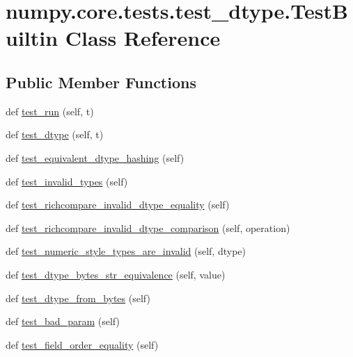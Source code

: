 \hypertarget{classnumpy_1_1core_1_1tests_1_1test__dtype_1_1TestBuiltin}{}\section{numpy.\+core.\+tests.\+test\+\_\+dtype.\+Test\+Builtin Class Reference}
\label{classnumpy_1_1core_1_1tests_1_1test__dtype_1_1TestBuiltin}
\subsection*{Public Member Functions}
\begin{DoxyCompactItemize}
\item 
def \hyperlink{classnumpy_1_1core_1_1tests_1_1test__dtype_1_1TestBuiltin_a9cf3c6b52b84e3db575e051558890263}{test\+\_\+run} (self, t)
\item 
def \hyperlink{classnumpy_1_1core_1_1tests_1_1test__dtype_1_1TestBuiltin_a336a8537bdbfcbe65d63fcca389a67c2}{test\+\_\+dtype} (self, t)
\item 
def \hyperlink{classnumpy_1_1core_1_1tests_1_1test__dtype_1_1TestBuiltin_a608e2c7ca1c4a6c6e9f61ad63c1aa0ec}{test\+\_\+equivalent\+\_\+dtype\+\_\+hashing} (self)
\item 
def \hyperlink{classnumpy_1_1core_1_1tests_1_1test__dtype_1_1TestBuiltin_a349337e58f527c99e71562c83eb94450}{test\+\_\+invalid\+\_\+types} (self)
\item 
def \hyperlink{classnumpy_1_1core_1_1tests_1_1test__dtype_1_1TestBuiltin_a805e97f2e760c631ed47b16bfa85af03}{test\+\_\+richcompare\+\_\+invalid\+\_\+dtype\+\_\+equality} (self)
\item 
def \hyperlink{classnumpy_1_1core_1_1tests_1_1test__dtype_1_1TestBuiltin_ae5f1c95dad9bc80fb75cafd2eeae1237}{test\+\_\+richcompare\+\_\+invalid\+\_\+dtype\+\_\+comparison} (self, operation)
\item 
def \hyperlink{classnumpy_1_1core_1_1tests_1_1test__dtype_1_1TestBuiltin_a54f89532774948e1b50fce0955196248}{test\+\_\+numeric\+\_\+style\+\_\+types\+\_\+are\+\_\+invalid} (self, dtype)
\item 
def \hyperlink{classnumpy_1_1core_1_1tests_1_1test__dtype_1_1TestBuiltin_ab5bb6cbd47b48b36bc7fbb011b94935e}{test\+\_\+dtype\+\_\+bytes\+\_\+str\+\_\+equivalence} (self, value)
\item 
def \hyperlink{classnumpy_1_1core_1_1tests_1_1test__dtype_1_1TestBuiltin_abc18da2587cf9e2c89921d2d4bc7f32b}{test\+\_\+dtype\+\_\+from\+\_\+bytes} (self)
\item 
def \hyperlink{classnumpy_1_1core_1_1tests_1_1test__dtype_1_1TestBuiltin_a88a1e17a6d155d3dca510f8a0e353d83}{test\+\_\+bad\+\_\+param} (self)
\item 
def \hyperlink{classnumpy_1_1core_1_1tests_1_1test__dtype_1_1TestBuiltin_a5ddd19a72a3c4e3929b40c9a2bbc4afb}{test\+\_\+field\+\_\+order\+\_\+equality} (self)
\end{DoxyCompactItemize}


